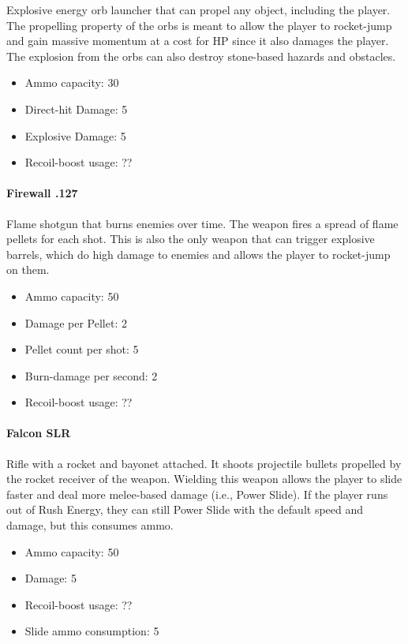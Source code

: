 \documentclass[12pt]{article}
\begin{document}
Explosive energy orb launcher that can propel any object, including the player. The propelling property of the orbs is meant to allow the player to rocket-jump and gain massive momentum at a cost for HP since it also damages the player. The explosion from the orbs can also destroy stone-based hazards and obstacles. 

\begin{itemize}
	\item Ammo capacity: 30
	\item Direct-hit Damage: 5
	\item Explosive Damage: 5
	\item Recoil-boost usage: ??
\end{itemize} 


\paragraph{Firewall .127}

Flame shotgun that burns enemies over time. The weapon fires a spread of flame pellets for each shot. This is also the only weapon that can trigger explosive barrels, which do high damage to enemies and allows the player to rocket-jump on them. 

\begin{itemize}
	\item Ammo capacity: 50
	\item Damage per Pellet: 2
	\item Pellet count per shot: 5
	\item Burn-damage per second: 2
	\item Recoil-boost usage: ??
\end{itemize} 

\paragraph{Falcon SLR}

Rifle with a rocket and bayonet attached. It shoots projectile bullets propelled by the rocket receiver of the weapon. Wielding this weapon allows the player to slide faster and deal more melee-based damage (i.e., Power Slide). If the player runs out of Rush Energy, they can still Power Slide with the default speed and damage, but this consumes ammo. 

\begin{itemize}
	\item Ammo capacity: 50
	\item Damage: 5
	\item Recoil-boost usage: ??
	\item Slide ammo consumption: 5
\end{itemize} 
\end{document}
